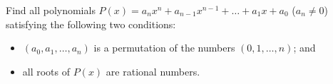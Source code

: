 Find all polynomials \(P(x) = a_n x^n + a_{n-1} x^{n-1} + \ldots + a_1 x + a_0\) (\(a_n \ne 0\)) satisfying the following two conditions:
\begin{itemize}
    \item[(i)] \((a_0,a_1,\ldots,a_n)\) is a permutation of the numbers \((0,1,\ldots,n)\); and
    \item[(ii)] all roots of \(P(x)\) are rational numbers.
\end{itemize}